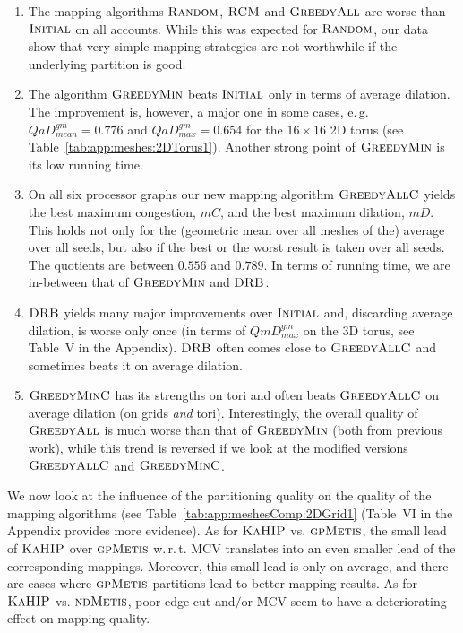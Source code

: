 \documentclass[pdftex]{llncs}
\newcommand{\eg}{e.\,g.\xspace}
\newcommand{\wrt}{w.\,r.\,t.\xspace}
\newcommand{\gpmetis}{\textsc{gpMetis}\xspace}
\newcommand{\ndmetis}{\textsc{ndMetis}\xspace}
\newcommand{\kahip}{\textsc{KaHIP}\xspace}
\newcommand{\initial}{\textsc{Initial}\xspace}
\newcommand{\random}{\textsc{Random}\xspace}
\newcommand{\rcm}{\textsc{RCM}\xspace}
\newcommand{\durebi}{\textsc{DRB}\xspace}
\newcommand{\greedyall}{\textsc{GreedyAll}\xspace}
\newcommand{\greedyallc}{\textsc{GreedyAllC}\xspace}
\newcommand{\greedymin}{\textsc{GreedyMin}\xspace}
\newcommand{\greedyminc}{\textsc{GreedyMinC}\xspace}
\begin{document}
\begin{enumerate}
\item The mapping algorithms $\random$, $\rcm$ and $\greedyall$ are worse than
  $\initial$ on all accounts. While this was expected for $\random$, our data show
  that very simple mapping strategies are not worthwhile if the underlying
  partition is good.

\item The algorithm $\greedymin$ beats $\initial$ only in terms of
  average dilation. The improvement is, however, a major one in some
  cases, \eg $QaD^{gm}_{mean} = 0.776$ and $QaD^{gm}_{max} = 0.654$
  for the $16 \times 16$ 2D torus (see
  Table~\ref{tab:app:meshes:2DTorus1}). Another strong point of
  $\greedymin$ is its low running time.


\item On all six processor graphs our new mapping algorithm
  $\greedyallc$ yields the best maximum congestion, $mC$, and the best
  maximum dilation, $mD$. This holds not only for the (geometric mean
  over all meshes of the) average over all seeds, but also if the best
  or the worst result is taken over all seeds. The quotients are
  between $0.556$ and $0.789$. In terms of running time, we are
  in-between that of $\greedymin$ and $\durebi$.

\item $\durebi$ yields many major improvements over $\initial$ and,
  discarding average dilation, is worse only once (in terms of
  $QmD^{gm}_{max}$ on the 3D torus, see Table~V in the
  Appendix). $\durebi$ often comes close to $\greedyallc$ and
  sometimes beats it on average dilation.

\item $\greedyminc$ has its strengths on tori and often beats
  $\greedyallc$ on average dilation (on grids \emph{and}
  tori). Interestingly, the overall quality of $\greedyall$ is much
  worse than that of $\greedymin$ (both from previous work),
  while this trend is reversed if we
  look at the modified versions $\greedyallc$ and $\greedyminc$.
\end{enumerate}

We now look at the influence of the partitioning quality on the
quality of the mapping algorithms (see
Table~\ref{tab:app:meshesComp:2DGrid1} (Table~VI in the Appendix
provides more evidence). As for $\kahip$ vs. $\gpmetis$, the small
lead of $\kahip$ over $\gpmetis$ \wrt MCV translates into an even
smaller lead of the corresponding mappings. Moreover, this small lead
is only on average, and there are cases where $\gpmetis$ partitions
lead to better mapping results.  As for $\kahip$ vs. $\ndmetis$, poor
edge cut and$\slash$or MCV seem to have a deteriorating effect on
mapping quality.
\end{document}
